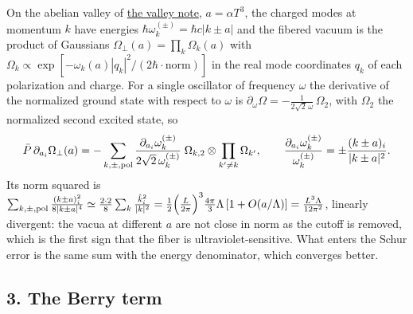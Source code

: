 \documentclass[11pt,a4paper]{article}
\begin{document}
On the abelian valley of \href{torus-valley-potential.md}{the valley
note}, \(a=\alpha T^3\), the charged modes at momentum \(k\) have
energies \(\hbar\omega_k^{(\pm)}=\hbar c|k\pm a|\) and the fibered
vacuum is the product of Gaussians
\(\Omega_\perp(a)=\prod_k\Omega_k(a)\) with
\(\Omega_k\propto\exp[-\omega_k(a)|q_k|^2/(2\hbar\cdot\text{norm})]\) in
the real mode coordinates \(q_k\) of each polarization and charge. For a
single oscillator of frequency \(\omega\) the derivative of the
normalized ground state with respect to \(\omega\) is
\(\partial_\omega\Omega=-\frac{1}{2\sqrt2\,\omega}\,\Omega_2\), with
\(\Omega_2\) the normalized second excited state, so
\[\bar P\,\partial_{a_i}\Omega_\perp(a)=-\sum_{k,\pm,{\rm pol}}\frac{\partial_{a_i}\omega_k^{(\pm)}}{2\sqrt2\,\omega_k^{(\pm)}}\;\Omega_{k,2}\otimes\prod_{k'\ne k}\Omega_{k'},
\qquad\frac{\partial_{a_i}\omega_k^{(\pm)}}{\omega_k^{(\pm)}}=\pm\frac{(k\pm a)_i}{|k\pm a|^2}.\]
Its norm squared is
\(\sum_{k,\pm,{\rm pol}}\frac{(k\pm a)_i^2}{8|k\pm a|^4}\simeq\frac{2\cdot2}{8}\sum_k\frac{\hat k_i^2}{|k|^2} =\frac12\Big(\frac L{2\pi}\Big)^3\frac{4\pi}{3}\Lambda\,[1+O(a/\Lambda)]=\frac{L^3\Lambda}{12\pi^2}\),
linearly divergent: the vacua at different \(a\) are not close in norm
as the cutoff is removed, which is the first sign that the fiber is
ultraviolet-sensitive. What enters the Schur error is the same sum with
the energy denominator, which converges better.

\hypertarget{the-berry-term}{%
\subsection{3. The Berry term}\label{the-berry-term}}
\end{document}
